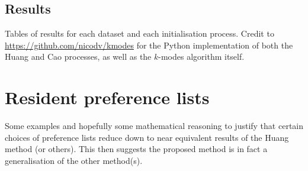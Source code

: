 \documentclass{article}
\theoremstyle{definition}
\begin{document}
\subsection{Results}\label{subsection:results}

Tables of results for each dataset and each initialisation process. Credit to \url{https://github.com/nicodv/kmodes} for the Python implementation of both the Huang and Cao processes, as well as the $k$-modes algorithm itself.

\section{Resident preference lists}\label{section:preferences}

Some examples and hopefully some mathematical reasoning to justify that certain choices of preference lists reduce down to near equivalent results of the Huang method (or others). This then suggests the proposed method is in fact a generalisation of the other method(s).


\printbibliography
\end{document}
